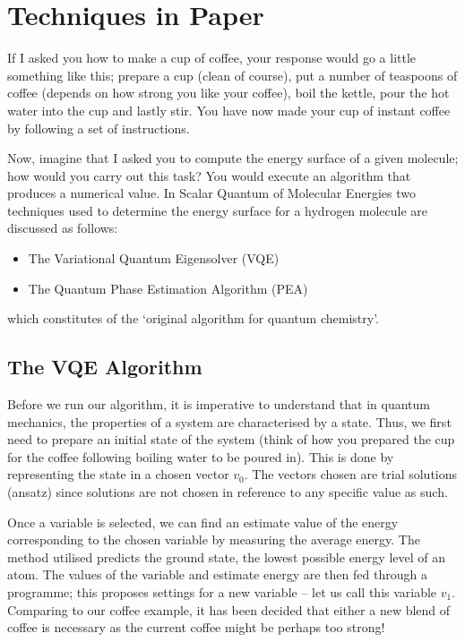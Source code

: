 \documentclass[12pt]{article}
\begin{document}
\section{Techniques in Paper}
If I asked you how to make a cup of coffee, your response would go a little something like this; prepare a cup (clean of course), put a number of
 teaspoons of coffee (depends on how strong you like your coffee), boil the kettle, pour the hot water into the cup and lastly stir. You have now
 made your cup of instant coffee by following a set of instructions.

Now, imagine that I asked you to compute the energy surface of a given molecule; how would you carry out this task? You would execute an algorithm
 that produces a numerical value. In Scalar Quantum of Molecular Energies two techniques used to determine the energy surface for a hydrogen molecule
 are discussed as follows:
\begin{itemize}
\item The Variational Quantum Eigensolver (VQE)
\item The Quantum Phase Estimation Algorithm (PEA)
\end{itemize}
which constitutes of the ‘original algorithm for quantum chemistry’.

\subsection{The VQE Algorithm}

Before we run our algorithm, it is imperative to understand that in quantum mechanics, the properties of a system are characterised by a state.
Thus, we first need to prepare an initial state of the system (think of how you prepared the cup for the coffee following boiling water to be
poured in). This is done by representing the state in a chosen vector $v_0$. The vectors chosen are trial solutions (ansatz) since solutions are
 not chosen in reference to any specific value as such.

Once a variable is selected, we can find an estimate value of the energy corresponding to the chosen variable by measuring the average energy.
The method utilised predicts the ground state, the lowest possible energy level of an atom. The values of the variable and estimate energy are
then fed through a programme; this proposes settings for a new variable – let us call this variable $v_1$­. Comparing to our coffee example, it
 has been decided that either a new blend of coffee is necessary as the current coffee might be perhaps too strong!
\end{document}
